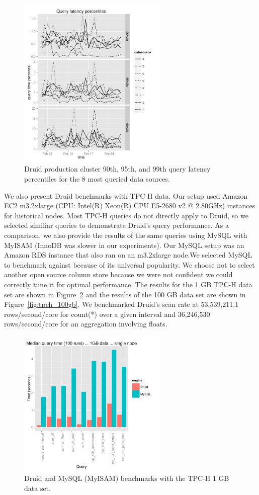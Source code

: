 \documentclass{acm_proc_article-sp}
\begin{document}
\begin{figure}
\centering
\includegraphics[width = 2.8in]{query_percentiles}
\caption{Druid production cluster 90th, 95th, and 99th query latency percentiles for the 8 most queried data sources.}
\label{fig:query_percentiles}
\end{figure}

We also present Druid benchmarks with TPC-H data. Our setup used Amazon EC2
m3.2xlarge (CPU: Intel(R) Xeon(R) CPU E5-2680 v2 @ 2.80GHz) instances for
historical nodes. Most TPC-H queries do not directly apply to Druid, so we
selected similiar queries to demonstrate Druid's query performance. As a
comparison, we also provide the results of the same queries using MySQL with
MyISAM (InnoDB was slower in our experiments). Our MySQL setup was an Amazon
RDS instance that also ran on an m3.2xlarge node.We selected MySQL to benchmark
against because of its universal popularity. We choose not to select another
open source column store because we were not confident we could correctly tune
it for optimal performance. The results for the 1 GB TPC-H data set are shown
in Figure~\ref{fig:tpch_1gb} and the results of the 100 GB data set are shown
in Figure~\ref{fig:tpch_100gb}. We benchmarked Druid's scan rate at
53,539,211.1 rows/second/core for count(*) over a given interval and 36,246,530
rows/second/core for an aggregation involving floats.

\begin{figure}
\centering
\includegraphics[width = 2.8in]{tpch_1gb}
\caption{Druid and MySQL (MyISAM) benchmarks with the TPC-H 1 GB data set.}
\label{fig:tpch_1gb}
\end{figure}
\end{document}
